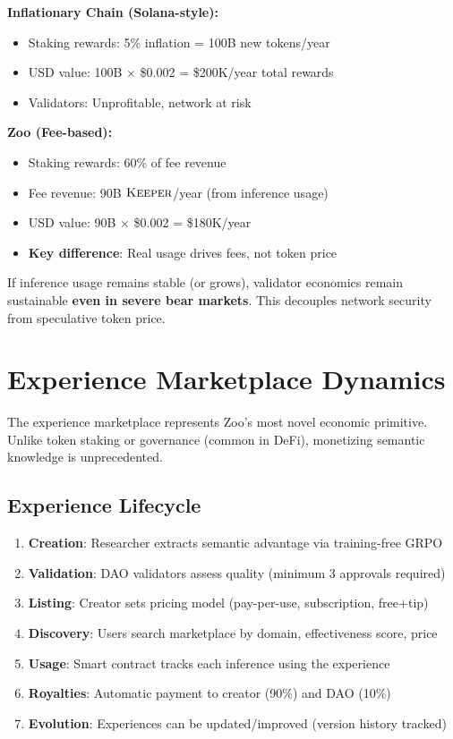 \documentclass[11pt,letterpaper]{article}
\theoremstyle{definition}
\theoremstyle{remark}
\newcommand{\KEEPER}{\textsc{Keeper}}
\begin{document}
\textbf{Inflationary Chain (Solana-style):}
\begin{itemize}
\item Staking rewards: 5\% inflation = 100B new tokens/year
\item USD value: 100B × \$0.002 = \$200K/year total rewards
\item Validators: Unprofitable, network at risk
\end{itemize}

\textbf{Zoo (Fee-based):}
\begin{itemize}
\item Staking rewards: 60\% of fee revenue
\item Fee revenue: 90B $\KEEPER$/year (from inference usage)
\item USD value: 90B × \$0.002 = \$180K/year
\item \textbf{Key difference}: Real usage drives fees, not token price
\end{itemize}

If inference usage remains stable (or grows), validator economics remain sustainable \textbf{even in severe bear markets}. This decouples network security from speculative token price.

\section{Experience Marketplace Dynamics}

The experience marketplace represents Zoo's most novel economic primitive. Unlike token staking or governance (common in DeFi), monetizing semantic knowledge is unprecedented.

\subsection{Experience Lifecycle}

\begin{enumerate}
\item \textbf{Creation}: Researcher extracts semantic advantage via training-free GRPO
\item \textbf{Validation}: DAO validators assess quality (minimum 3 approvals required)
\item \textbf{Listing}: Creator sets pricing model (pay-per-use, subscription, free+tip)
\item \textbf{Discovery}: Users search marketplace by domain, effectiveness score, price
\item \textbf{Usage}: Smart contract tracks each inference using the experience
\item \textbf{Royalties}: Automatic payment to creator (90\%) and DAO (10\%)
\item \textbf{Evolution}: Experiences can be updated/improved (version history tracked)
\end{enumerate}
\end{document}
